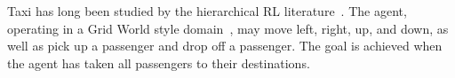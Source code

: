 %
%


Taxi has long been studied by the hierarchical RL literature~\cite{dietterich2000hierarchical}. The agent, operating in a Grid World style domain~\cite{russell1995modern}, may move left, right, up, and down, as well as pick up a passenger and drop off a passenger. The goal is achieved when the agent has taken all passengers to their destinations.






